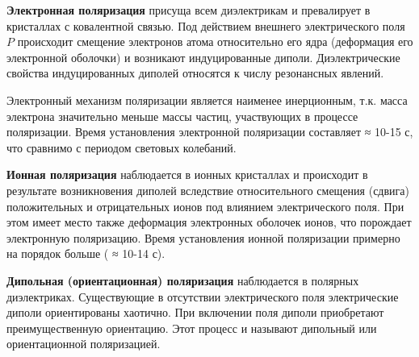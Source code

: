 \documentclass[__main__.tex]{subfiles}
\begin{document}
\textbf{Электронная поляризация} присуща всем диэлектрикам и превалирует в кристаллах с ковалентной связью. Под действием внешнего электрического поля $P$ происходит смещение электронов атома относительно его ядра (деформация его электронной оболочки) и возникают индуцированные диполи. Диэлектрические свойства индуцированных диполей относятся к числу резонансных явлений.

Электронный механизм поляризации является наименее инерционным, т.к. масса электрона значительно меньше массы частиц, участвующих в процессе поляризации. Время установления электронной поляризации составляет ≈ 10-15 с, что сравнимо с периодом световых колебаний.

\textbf{Ионная поляризация} наблюдается в ионных кристаллах и происходит в результате возникновения диполей вследствие относительного смещения (сдвига) положительных и отрицательных ионов под влиянием электрического поля. При этом имеет место также деформация электронных оболочек ионов, что порождает электронную поляризацию. Время установления ионной поляризации примерно на порядок больше ( ≈ 10-14 с).

\textbf{Дипольная (ориентационная) поляризация} наблюдается в полярных диэлектриках. Существующие в отсутствии электрического поля электрические диполи ориентированы хаотично. При включении поля диполи приобретают преимущественную ориентацию. Этот процесс и называют дипольный или ориентационной поляризацией.
\end{document}
